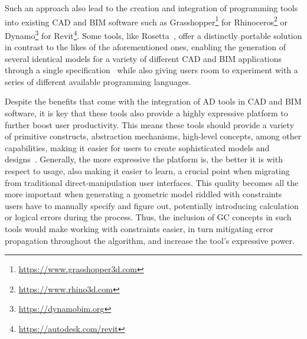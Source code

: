 Such an approach also lead to the creation and integration of programming tools
into existing \ac{CAD} and \ac{BIM} software such as
Grasshopper\footnote{\url{https://www.grasshopper3d.com}} for
Rhinoceros\footnote{\url{https://www.rhino3d.com}} or
Dynamo\footnote{\url{https://dynamobim.org}} for
Revit\footnote{\url{https://autodesk.com/revit}}.  Some tools, like
Rosetta~\cite{Leitao:2011:PGDCAD}, offer a distinctly portable solution in
contrast to the likes of the aforementioned ones, enabling the generation of
several identical models for a variety of different \ac{CAD} and \ac{BIM}
applications through a single specification~\cite{CasteloBranco:2017:IAD} while
also giving users room to experiment with a series of different available
programming languages.

Despite the benefits that come with the integration of \ac{AD} tools in \ac{CAD}
and \ac{BIM} software, it is key that these tools also provide a highly
expressive platform to further boost user productivity.  This means these tools
should provide a variety of primitive constructs, abstraction mechanisms,
high-level concepts, among other capabilities, making it easier for users to
create sophisticated models and designs~\cite{Leitao:2014:IGDAGHOP}.  Generally,
the more expressive the platform is, the better it is with respect to usage,
also making it easier to learn, a crucial point when migrating from traditional
direct-manipulation user interfaces.  This quality becomes all the more
important when generating a geometric model riddled with constraints users have
to manually specify and figure out, potentially introducing calculation or
logical errors during the process.  Thus, the inclusion of \ac{GC} concepts in
such tools would make working with constraints easier, in turn mitigating error
propagation throughout the algorithm, and increase the tool's expressive power.

